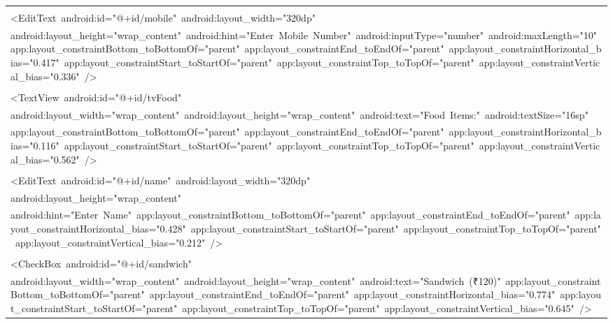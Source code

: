 \documentclass[a4paper,12pt]{article}
\begin{document}
\begin{longtable}{|p{}|}
\strut \\
{\ttfamily\small \textless{}EditText\ android:id="@+id/mobile"\ android:layout\_width="320dp"} \\
{\ttfamily\small android:layout\_height="wrap\_content"\ android:hint="Enter\ Mobile\ Number"\ android:inputType="number"\ android:maxLength="10"\ app:layout\_constraintBottom\_toBottomOf="parent"\ app:layout\_constraintEnd\_toEndOf="parent"\ app:layout\_constraintHorizontal\_bias="0.417"\ app:layout\_constraintStart\_toStartOf="parent"\ app:layout\_constraintTop\_toTopOf="parent"\ app:layout\_constraintVertical\_bias="0.336"\ /\textgreater{}} \\
\strut \\
{\ttfamily\small \textless{}TextView\ android:id="@+id/tvFood"} \\
{\ttfamily\small android:layout\_width="wrap\_content"\ android:layout\_height="wrap\_content"\ android:text="Food\ Items:"\ android:textSize="16sp"} \\
{\ttfamily\small app:layout\_constraintBottom\_toBottomOf="parent"\ app:layout\_constraintEnd\_toEndOf="parent"\ app:layout\_constraintHorizontal\_bias="0.116"\ app:layout\_constraintStart\_toStartOf="parent"\ app:layout\_constraintTop\_toTopOf="parent"\ app:layout\_constraintVertical\_bias="0.562"\ /\textgreater{}} \\
\strut \\
{\ttfamily\small \textless{}EditText\ android:id="@+id/name"\ android:layout\_width="320dp"} \\
{\ttfamily\small android:layout\_height="wrap\_content"} \\
{\ttfamily\small android:hint="Enter\ Name"\ app:layout\_constraintBottom\_toBottomOf="parent"\ app:layout\_constraintEnd\_toEndOf="parent"\ app:layout\_constraintHorizontal\_bias="0.428"\ app:layout\_constraintStart\_toStartOf="parent"\ app:layout\_constraintTop\_toTopOf="parent"\ app:layout\_constraintVertical\_bias="0.212"\ /\textgreater{}} \\
\strut \\
{\ttfamily\small \textless{}CheckBox\ android:id="@+id/sandwich"} \\
{\ttfamily\small android:layout\_width="wrap\_content"\ android:layout\_height="wrap\_content"\ android:text="Sandwich\ (₹120)"\ app:layout\_constraintBottom\_toBottomOf="parent"\ app:layout\_constraintEnd\_toEndOf="parent"\ app:layout\_constraintHorizontal\_bias="0.774"\ app:layout\_constraintStart\_toStartOf="parent"\ app:layout\_constraintTop\_toTopOf="parent"\ app:layout\_constraintVertical\_bias="0.645"\ /\textgreater{}} \\

\end{longtable}
\end{document}
